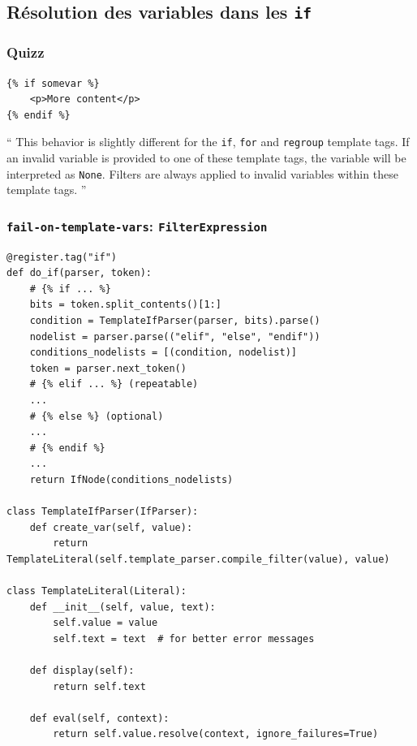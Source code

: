 \documentclass{beamer}
\begin{document}
\subsection*{Résolution des variables dans les \texttt{if}}

\begin{frame}[fragile]
    \frametitle{Quizz}
    \begin{verbatim}
{% if somevar %}
    <p>More content</p>
{% endif %}
    \end{verbatim}
    \pause
    \foreignquote{english}{
        This behavior is slightly different for the \texttt{if}, \texttt{for}
        and \texttt{regroup} template tags. If an invalid variable is provided
        to one of these template tags, the variable will be interpreted as
        \texttt{None}. Filters are always applied to invalid variables within
        these template tags.
    }
\end{frame}

\begin{frame}[fragile]
    \frametitle{\texttt{fail-on-template-vars}: \texttt{FilterExpression}}

    \begin{verbatim}
@register.tag("if")
def do_if(parser, token):
    # {% if ... %}
    bits = token.split_contents()[1:]
    condition = TemplateIfParser(parser, bits).parse()
    nodelist = parser.parse(("elif", "else", "endif"))
    conditions_nodelists = [(condition, nodelist)]
    token = parser.next_token()
    # {% elif ... %} (repeatable)
    ...
    # {% else %} (optional)
    ...
    # {% endif %}
    ...
    return IfNode(conditions_nodelists)

class TemplateIfParser(IfParser):
    def create_var(self, value):
        return TemplateLiteral(self.template_parser.compile_filter(value), value)

class TemplateLiteral(Literal):
    def __init__(self, value, text):
        self.value = value
        self.text = text  # for better error messages

    def display(self):
        return self.text

    def eval(self, context):
        return self.value.resolve(context, ignore_failures=True)
    \end{verbatim}
\end{frame}
\end{document}
